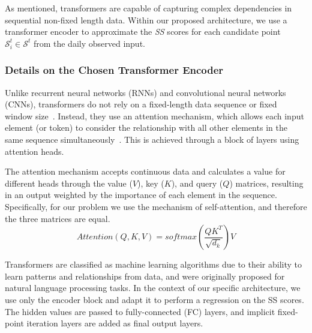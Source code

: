 As mentioned, transformers are capable of capturing complex dependencies in sequential non-fixed length data.
Within our proposed architecture, we use a transformer encoder to approximate the \textit{SS} scores
for each candidate point $\mathcal{S}_{i}^{t} \in \mathcal{S}^{t}$ from the daily observed input.

\subsubsection{Details on the Chosen Transformer Encoder}

Unlike recurrent neural networks (RNNs) and convolutional neural networks (CNNs), transformers do not rely on a fixed-length data sequence or fixed window size~\cite{Wen2023}.
Instead, they use an attention mechanism, which allows each input element (or token) to consider the relationship
with all other elements in the same sequence simultaneously~\cite{Vaswani2023}.
This is achieved through a block of layers using attention heads.

The attention mechanism accepts continuous data and calculates a value for different heads through the
value ($V$), key ($K$), and query ($Q$) matrices,
resulting in an output weighted by the importance of each element in the sequence.
Specifically, for our problem we use the mechanism of self-attention, and therefore the three matrices are equal.
\begin{equation}
    \label{eq:attention}
    \textit{Attention}(Q, K, V) = \textit{softmax}\left(\frac{QK^T}{\sqrt{d_k}}\right)V
\end{equation}

Transformers are classified as machine learning algorithms due to their ability to learn patterns and relationships from data, and were originally proposed for natural language processing tasks.
In the context of our specific architecture, we use only the encoder block and adapt it to perform a regression on the SS scores.
The hidden values are passed to fully-connected (FC) layers, and implicit fixed-point iteration layers are added as final output layers.

